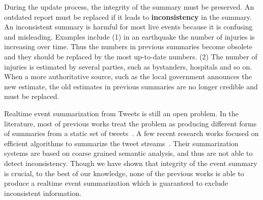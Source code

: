 \documentclass[envcountsame]{llncs}
\begin{document}
During the update process, the integrity of the summary must be preserved.  An outdated report must be replaced if it leads to \textbf{inconsistency} in the summary. An inconsistent summary is harmful for most live events because it is confusing and misleading. Examples include (1) in an earthquake the number of injuries is increasing over time. Thus the numbers in previous summaries become obsolete and they should be replaced by the most up-to-date numbers. (2) The number of injuries is  estimated by several parties, such as  bystanders, hospitals and so on. When a more authoritative source, such as the local government announces the new estimate, the old estimates in previous summaries are no longer credible and must be replaced.

Realtime event summarization from Tweets is still an open problem. In the literature, most of previous works treat the problem as producing different forms of summaries from a static set of tweets~\cite{Takamura2011Summarizing,Lin2012Generating,Rudra2015Extracting,Liu2016LEDS,Gillani2017Post}. A few recent research works focused on efficient algorithms to summarize the tweet streams~\cite{Shou2013Sumblr,Zubiaga2012Towards}. Their summarization systems are based on coarse grained semantic analysis, and thus are not able to detect inconsistency. Though we have shown that integrity of the event summary is crucial, to the best of our knowledge, none of the previous works is able to produce a realtime event summarization which is guaranteed to exclude inconsistent information.
\end{document}
